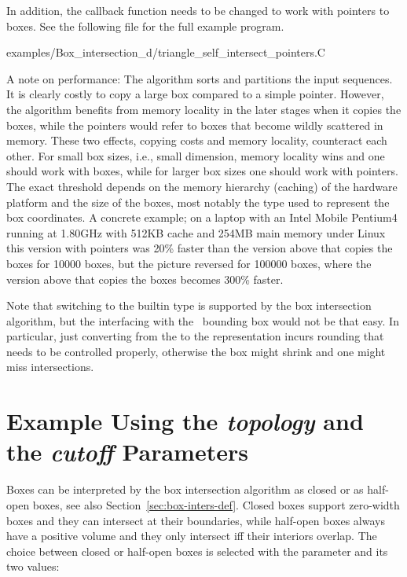 In addition, the callback function  needs to be
changed to work with pointers to boxes. See the following file for the
full example program.

\begin{ccExampleCode}
    examples/Box_intersection_d/triangle_self_intersect_pointers.C
\end{ccExampleCode}

A note on performance: The algorithm sorts and partitions the input
sequences. It is clearly costly to copy a large box compared to a
simple pointer. However, the algorithm benefits from memory locality
in the later stages when it copies the boxes, while the pointers would
refer to boxes that become wildly scattered in memory.  These two
effects, copying costs and memory locality, counteract each other. For
small box sizes, i.e., small dimension, memory locality wins and one
should work with boxes, while for larger box sizes one should work
with pointers. The exact threshold depends on the memory hierarchy
(caching) of the hardware platform and the size of the boxes, most
notably the type used to represent the box coordinates. A concrete
example; on a laptop with an Intel Mobile Pentium4 running at 1.80GHz
with 512KB cache and 254MB main memory under Linux this version with
pointers was 20\% faster than the version above that copies the boxes
for 10000 boxes, but the picture reversed for 100000 boxes, where the
version above that copies the boxes becomes 300\% faster.

Note that switching to the builtin type  is supported by
the box intersection algorithm, but the interfacing with the \cgal\ 
bounding box  would not be that easy. In particular,
just converting from the \ccc{double} to the \ccc{float}
representation incurs rounding that needs to be controlled properly,
otherwise the box might shrink and one might miss intersections.


\section{Example Using the \textit{topology} and the \textit{cutoff} 
Parameters}\label{sec:box-inters-params}

Boxes can be interpreted by the box intersection algorithm as closed
or as half-open boxes, see also Section~\ref{sec:box-inters-def}.  Closed
boxes support zero-width boxes and they can intersect at their
boundaries, while half-open boxes always have a positive volume and
they only intersect iff their interiors overlap.  The choice between
closed or half-open boxes is selected with the \ccc{topology}
parameter and its two values:

